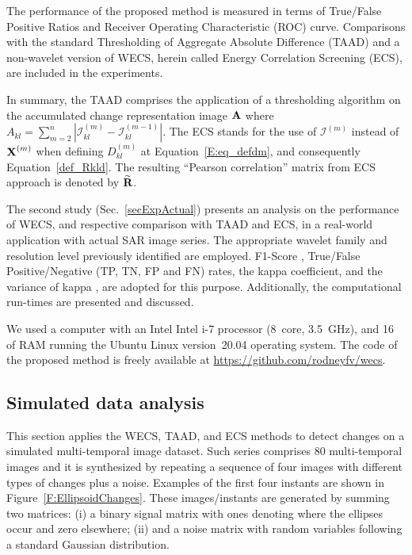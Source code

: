 \documentclass[journal]{IEEEtran}
\newcommand{\vA}{{\textbf A}}
\newcommand{\vR}{{\textbf R}}
\newcommand{\vX}{{\textbf X}}
\begin{document}
The performance of the proposed method is measured in terms of True/False Positive Ratios and Receiver Operating Characteristic (ROC) curve. 
Comparisons with the standard Thresholding of Aggregate Absolute Difference (TAAD) and a non-wavelet version of WECS, herein called Energy Correlation Screening (ECS), are included in the experiments. 


In summary, the TAAD comprises the application of a thresholding algorithm on the accumulated change representation image $\vA$ where $A_{kl} = \sum_{m=2}^{n}|\mathcal{I}_{kl}^{(m)}-\mathcal{I}_{kl}^{(m-1)}|$. 
The ECS stands for the use of $\mathcal{I}^{(m)}$ instead of $\vX^{(m)}$ when defining $D_{kl}^{(m)}$ at Equation~\ref{E:eq_defdm}, and consequently Equation~\ref{def_Rkld}. The resulting ``Pearson correlation'' matrix from ECS approach is denoted by $\widetilde{\vR}$.


The second study (Sec.~\ref{secExpActual}) presents an analysis on the performance of WECS, and respective comparison with TAAD and ECS, in a real-world application with actual SAR image series. The appropriate wavelet family and resolution level previously identified are employed. 
F1-Score \cite{Rijsbergen1979}, True/False Positive/Negative (TP, TN, FP and FN) rates, the kappa coefficient, and the variance of kappa \cite{Congalton2019}, are adopted for this purpose. Additionally, the computational run-times are presented and discussed.



We used a computer with an Intel Intel i-7 processor (\SI{8}{core}, \SI{3.5}{\giga\hertz}), and \SI{16}{\giga\byte} of RAM running the Ubuntu Linux version~20.04 operating system.
The code of the proposed method is freely available at \url{https://github.com/rodneyfv/wecs}. 


\subsection{Simulated data analysis}\label{secExpSimulated}

This section applies the WECS, TAAD, and ECS methods to detect changes on a simulated multi-temporal image dataset. 
Such series comprises 80 multi-temporal images and it is synthesized by repeating a sequence of four images with different types of changes plus a noise. 
Examples of the first four instants are shown in Figure~\ref{F:EllipsoidChanges}. 
These images/instants are generated by summing two matrices: (i) a binary signal matrix with ones denoting where the ellipses occur and zero elsewhere; (ii) and a noise matrix with random variables following a standard Gaussian distribution. 
\end{document}

